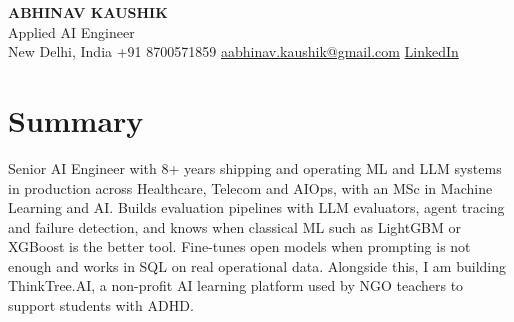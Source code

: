 \documentclass[10pt,a4paper]{article}
\begin{document}
\begin{center}
  {\LARGE\bfseries ABHINAV KAUSHIK}\\[2pt]
  {\large Applied AI Engineer}\\[2pt]
  New Delhi, India \textbar{} +91 8700571859 \textbar{} \href{mailto:aabhinav.kaushik@gmail.com}{aabhinav.kaushik@gmail.com} \textbar{} \href{https://www.linkedin.com/in/abhinav-kaushik10/}{LinkedIn}  
\end{center}

\section{Summary}
Senior AI Engineer with 8+ years shipping and operating ML and LLM systems in production across Healthcare, Telecom and AIOps, with an MSc in Machine Learning and AI. Builds evaluation pipelines with LLM evaluators, agent tracing and failure detection, and knows when classical ML such as LightGBM or XGBoost is the better tool. Fine-tunes open models when prompting is not enough and works in SQL on real operational data. Alongside this, I am building ThinkTree.AI, a non-profit AI learning platform used by NGO teachers to support students with ADHD.
\end{document}
